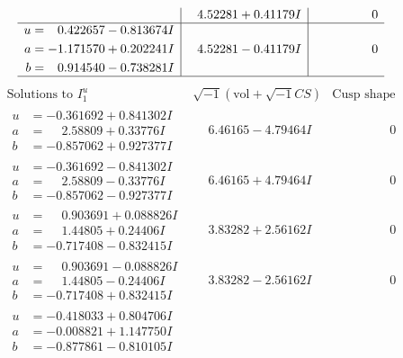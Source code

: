 \documentclass[1p]{elsarticle_modified}
\theoremstyle{definition}
\newcommand{\I}{\sqrt{-1}}
\begin{document}
$$\begin{array}{c|c|c}
 & \phantom{-}4.52281 + 0.41179 I & \phantom{-0.000000 } 0 \\ \hline\begin{aligned}
u &= \phantom{-}0.422657 - 0.813674 I \\
a &= -1.171570 + 0.202241 I \\
b &= \phantom{-}0.914540 - 0.738281 I\end{aligned}
 & \phantom{-}4.52281 - 0.41179 I & \phantom{-0.000000 } 0\\
 \hline 
 \end{array}$$\newpage$$\begin{array}{c|c|c}  
\text{Solutions to }I^u_{1}& \I (\text{vol} + \sqrt{-1}CS) & \text{Cusp shape}\\
 \hline 
\begin{aligned}
u &= -0.361692 + 0.841302 I \\
a &= \phantom{-}2.58809 + 0.33776 I \\
b &= -0.857062 + 0.927377 I\end{aligned}
 & \phantom{-}6.46165 - 4.79464 I & \phantom{-0.000000 } 0 \\ \hline\begin{aligned}
u &= -0.361692 - 0.841302 I \\
a &= \phantom{-}2.58809 - 0.33776 I \\
b &= -0.857062 - 0.927377 I\end{aligned}
 & \phantom{-}6.46165 + 4.79464 I & \phantom{-0.000000 } 0 \\ \hline\begin{aligned}
u &= \phantom{-}0.903691 + 0.088826 I \\
a &= \phantom{-}1.44805 + 0.24406 I \\
b &= -0.717408 - 0.832415 I\end{aligned}
 & \phantom{-}3.83282 + 2.56162 I & \phantom{-0.000000 } 0 \\ \hline\begin{aligned}
u &= \phantom{-}0.903691 - 0.088826 I \\
a &= \phantom{-}1.44805 - 0.24406 I \\
b &= -0.717408 + 0.832415 I\end{aligned}
 & \phantom{-}3.83282 - 2.56162 I & \phantom{-0.000000 } 0 \\ \hline\begin{aligned}
u &= -0.418033 + 0.804706 I \\
a &= -0.008821 + 1.147750 I \\
b &= -0.877861 - 0.810105 I\end{aligned}

\end{array}$$
\end{document}
